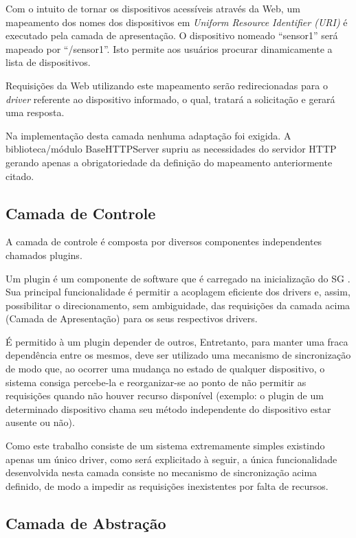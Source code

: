 \documentclass[12pt,a4paper,oneside]{report}
\begin{document}
Com o intuito de tornar os dispositivos acessíveis através da Web, um mapeamento dos nomes dos dispositivos em \emph{Uniform Resource Identifier (URI)} \cite{w3curi} é executado pela camada de apresentação. O dispositivo nomeado ``sensor1'' será mapeado por ``/sensor1''. Isto permite aos usuários procurar dinamicamente a lista de dispositivos.

Requisições da Web utilizando este mapeamento serão redirecionadas para o \emph{driver} referente ao dispositivo informado, o qual, tratará a solicitação e gerará uma resposta.

Na implementação desta camada nenhuma adaptação foi exigida. A biblioteca/módulo BaseHTTPServer supriu as necessidades do servidor HTTP gerando apenas a obrigatoriedade da definição do mapeamento anteriormente citado.

\subsection{Camada de Controle}

A camada de controle é composta por diversos componentes independentes chamados plugins.

Um plugin é um componente de software que é carregado na inicialização do SG . Sua principal funcionalidade é permitir a acoplagem eficiente dos drivers e, assim, possibilitar o direcionamento, sem ambiguidade, das requisições da camada acima (Camada de Apresentação) para os seus respectivos drivers.

É permitido à um plugin depender de outros, Entretanto, para manter uma fraca dependência entre os mesmos, deve ser utilizado uma mecanismo de sincronização de modo que, ao ocorrer uma mudança no estado de qualquer dispositivo, o sistema consiga percebe-la e reorganizar-se ao ponto de não permitir as requisições quando não houver recurso disponível (exemplo: o plugin de um determinado dispositivo chama seu método independente do dispositivo estar ausente ou não).

Como este trabalho consiste de um sistema extremamente simples existindo apenas um único driver, como será explicitado à seguir, a única funcionalidade desenvolvida nesta camada consiste no mecanismo de sincronização acima definido, de modo a impedir as requisições inexistentes por falta de recursos.

\subsection{Camada de Abstração}
\end{document}
